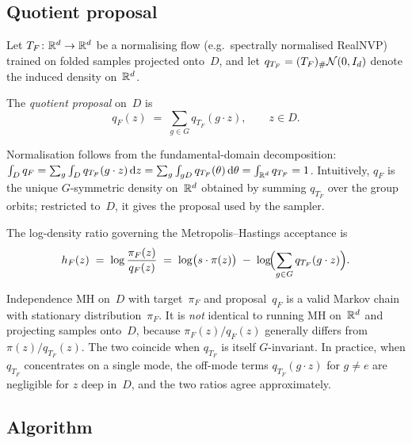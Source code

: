 \subsection{Quotient proposal}
\label{sec:quotient_proposal}

Let $T_F\colon \mathbb{R}^d \to \mathbb{R}^d$ be a normalising flow
(e.g.\ spectrally normalised RealNVP) trained on folded samples
projected onto~$D$, and let
$q_{T_F} = (T_F)_{\#}\mathcal{N}(0, I_d)$ denote the induced density
on~$\mathbb{R}^d$.

\begin{definition}\label{def:quotient_proposal}
  The \emph{quotient proposal} on~$D$ is
  \begin{equation}\label{eq:q_F}
    q_F(z) \;=\; \sum_{g \in G} q_{T_F}(g \cdot z), \qquad z \in D.
  \end{equation}
\end{definition}

\noindent
Normalisation follows from the fundamental-domain decomposition:
$\int_D q_F = \sum_g \int_D q_{T_F}(g \cdot z)\,\mathrm{d}z
= \sum_g \int_{gD} q_{T_F}(\theta)\,\mathrm{d}\theta
= \int_{\mathbb{R}^d} q_{T_F} = 1$.
Intuitively, $q_F$ is the unique $G$-symmetric density on~$\mathbb{R}^d$
obtained by summing $q_{T_F}$ over the group orbits;
restricted to~$D$, it gives the proposal used by the sampler.

The log-density ratio governing the Metropolis--Hastings
acceptance is
\begin{equation}\label{eq:h_F}
  h_F(z)
  \;=\; \log\frac{\pi_F(z)}{q_F(z)}
  \;=\; \log\bigl(s \cdot \pi(z)\bigr)
  \;-\; \log\!\Bigl(\sum_{g \in G} q_{T_F}(g \cdot z)\Bigr).
\end{equation}

\begin{remark}\label{rem:not_equivalent}
  Independence MH on~$D$ with target~$\pi_F$ and proposal~$q_F$ is
  a valid Markov chain with stationary distribution~$\pi_F$.  It is
  \emph{not} identical to running MH on~$\mathbb{R}^d$ and projecting
  samples onto~$D$, because $\pi_F(z)/q_F(z)$ generally differs from
  $\pi(z)/q_{T_F}(z)$.  The two coincide when $q_{T_F}$ is itself
  $G$-invariant.  In practice, when $q_{T_F}$ concentrates on a single
  mode, the off-mode terms $q_{T_F}(g \cdot z)$ for $g \neq e$ are
  negligible for $z$ deep in~$D$, and the two ratios agree
  approximately.
\end{remark}


\subsection{Algorithm}
\label{sec:algorithm}

